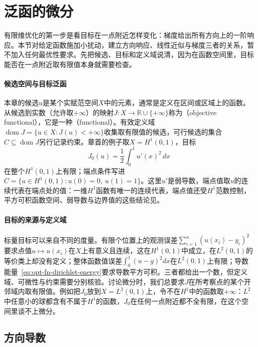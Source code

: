 
\section{泛函的微分}
\label{sec:opt-fn-differential}

有限维优化的第一步是看目标在一点附近怎样变化：梯度给出所有方向上的一阶响应。本节对给定函数施加小扰动，建立方向响应、线性近似与梯度三者的关系，暂不加入任何最优性要求。先把候选、目标和定义域说清，因为在函数空间里，目标能否在一点附近取有限值本身就需要检查。

\paragraph{候选空间与目标泛函}
本章的候选$u$是某个实赋范空间$X$中的元素，通常是定义在区间或区域上的函数。从候选到实数（允许取$+\infty$）的映射$J:X\to\mathbb R\cup\{+\infty\}$称为（objective functional），它是一种（functional）。有效定义域$\operatorname{dom}J=\{u\in X:J(u)<+\infty\}$收集取有限值的候选，可行候选的集合$C\subseteq\operatorname{dom}J$另行记录约束。章首的例子取$X=H^1(0,1)$，目标
\begin{equation}
 J_0(u)=\frac12\int_0^1u'(x)^2\,dx
 \label{eq:opt-fn-dirichlet-energy}
\end{equation}
在整个$H^1(0,1)$上有限；端点条件写进$C=\{u\in H^1(0,1):u(0)=0,\ u(1)=1\}$。这里$u'$是弱导数，端点值取$u$的连续代表在端点处的值：一维$H^1$函数有唯一的连续代表，端点值还受$H^1$范数控制，平方可积函数空间、弱导数与边界值的这些结论见。

\paragraph{目标的来源与定义域}
标量目标可以来自不同的度量。有限个位置上的观测误差$\sum_{i=1}^n(u(x_i)-y_i)^2$要求点值$u\mapsto u(x_i)$在$X$上有意义且连续，这在$H^1(0,1)$中成立，在$L^2(0,1)$的等价类上却没有定义；整体函数值误差$\int_0^1(u-g)^2dx$在$L^2(0,1)$上有限；导数能量~\eqref{eq:opt-fn-dirichlet-energy}要求导数平方可积。三者都给出一个数，但定义域、可微性与约束需要分别核验。讨论微分时，我们总要求$J$在所考察点的某个开邻域内取有限值。例如把$J_0$放到$X=L^2(0,1)$上，令不在$H^1$中的函数取$+\infty$：$L^2$中任意小的球都含有不属于$H^1$的函数，$J_0$在任何一点附近都不全有限，在这个空间里谈不上微分。

\subsection{方向导数}
\label{sec:opt-fn-directional}

